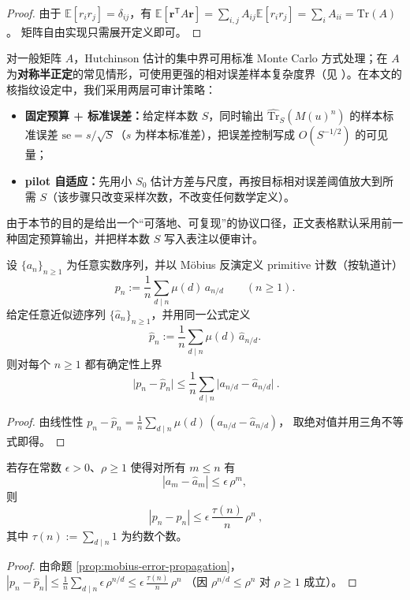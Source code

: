 \begin{proof}
由于 $\mathbb{E}[r_ir_j]=\delta_{ij}$，有
\(
\mathbb{E}[\mathbf r^{\mathsf T}A\mathbf r]=\sum_{i,j}A_{ij}\mathbb{E}[r_ir_j]=\sum_i A_{ii}=\mathrm{Tr}(A)
\)。
矩阵自由实现只需展开定义即可。
\end{proof}

\begin{remark}[误差口径与样本数选择]\label{rem:hutchinson-error}
对一般矩阵 $A$，Hutchinson 估计的集中界可用标准 Monte Carlo 方式处理；在 $A$ 为\textbf{对称半正定}的常见情形，可使用更强的相对误差样本复杂度界（见 \cite{Hutchinson1989ASE,AvronToledo2011Trace}）。在本文的核指纹设定中，我们采用两层可审计策略：
\begin{itemize}
  \item \textbf{固定预算 + 标准误差：}给定样本数 $S$，同时输出 $\widehat{\mathrm{Tr}}_S(M(u)^n)$ 的样本标准误差 $\mathrm{se}=s/\sqrt{S}$（$s$ 为样本标准差），把误差控制写成 $O(S^{-1/2})$ 的可见量；
  \item \textbf{pilot 自适应：}先用小 $S_0$ 估计方差与尺度，再按目标相对误差阈值放大到所需 $S$（该步骤只改变采样次数，不改变任何数学定义）。
\end{itemize}
由于本节的目的是给出一个“可落地、可复现”的协议口径，正文表格默认采用前一种固定预算输出，并把样本数 $S$ 写入表注以便审计。
\end{remark}

\begin{proposition}\label{prop:mobius-error-propagation}
设 \(\{a_n\}_{n\ge 1}\) 为任意实数序列，并以 Möbius 反演定义 primitive 计数（按轨道计）
\[
p_n:=\frac{1}{n}\sum_{d\mid n}\mu(d)\,a_{n/d}\qquad(n\ge 1).
\]
给定任意近似迹序列 \(\{\widehat a_n\}_{n\ge 1}\)，并用同一公式定义
\[
\widehat p_n:=\frac{1}{n}\sum_{d\mid n}\mu(d)\,\widehat a_{n/d}.
\]
则对每个 \(n\ge 1\) 都有确定性上界
\[
\boxed{\ 
\bigl|p_n-\widehat p_n\bigr|
\le \frac{1}{n}\sum_{d\mid n}\bigl|a_{n/d}-\widehat a_{n/d}\bigr|
\ }.
\]
\end{proposition}
\begin{proof}
由线性性
\(
p_n-\widehat p_n=\frac{1}{n}\sum_{d\mid n}\mu(d)\,(a_{n/d}-\widehat a_{n/d})
\)，
取绝对值并用三角不等式即得。
\end{proof}

\begin{corollary}[指数型迹误差 \texorpdfstring{$\Rightarrow$}{=>} primitive 误差的 \texorpdfstring{$\tau(n)/n$}{tau(n)/n} 界]\label{cor:mobius-exp-bound}
若存在常数 \(\epsilon>0\)、\(\rho\ge 1\) 使得对所有 \(m\le n\) 有
\[
|a_m-\widehat a_m|\le \epsilon\,\rho^m,
\]
则
\[
\boxed{\ 
|p_n-\widehat p_n|
\le \epsilon\,\frac{\tau(n)}{n}\,\rho^n
\ },
\]
其中 \(\tau(n):=\sum_{d\mid n}1\) 为约数个数。
\end{corollary}
\begin{proof}
由命题 \ref{prop:mobius-error-propagation}，
\(
|p_n-\widehat p_n|
\le \frac{1}{n}\sum_{d\mid n}\epsilon\,\rho^{n/d}
\le \epsilon\,\frac{\tau(n)}{n}\,\rho^n
\)
（因 \(\rho^{n/d}\le \rho^n\) 对 \(\rho\ge 1\) 成立）。
\end{proof}

